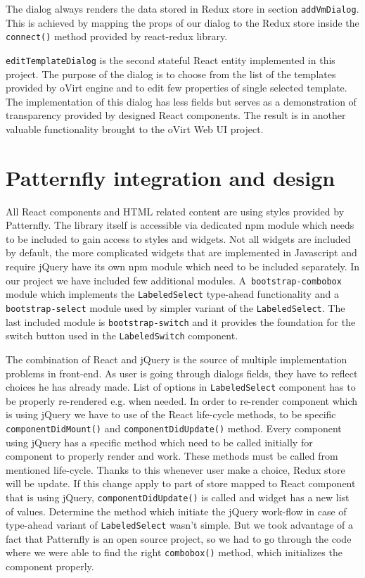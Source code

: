 The dialog always renders the data stored in Redux store in section \texttt{addVmDialog}. This is achieved by mapping the props of our dialog to the Redux store inside the \texttt{connect()} method provided by react-redux library. 

\texttt{editTemplateDialog} is the second stateful React entity implemented in this project. The purpose of the dialog is to choose from the list of the templates provided by oVirt engine and to edit few properties of single selected template. The implementation of this dialog has less fields but serves as a demonstration of transparency provided by designed React components. The result is in another valuable functionality brought to the oVirt Web UI project. 

\section{Patternfly integration and design}
All React components and HTML related content are using styles provided by Patternfly. The library itself is accessible via dedicated npm module which needs to be included to gain access to styles and widgets. Not all widgets are included by default, the more complicated widgets that are implemented in Javascript and require jQuery have its own npm module which need to be included separately. In our project we have included few additional modules. A~\texttt{bootstrap-combobox} module which implements the \texttt{LabeledSelect} type-ahead functionality and a \texttt{bootstrap-select} module used by simpler variant of the \texttt{LabeledSelect}. The last included module is \texttt{bootstrap-switch} and it provides the foundation for the switch button used in the \texttt{LabeledSwitch} component.

The combination of React and jQuery is the source of multiple implementation problems in front-end. As user is going through dialogs fields, they have to reflect choices he has already made. List of options in \texttt{LabeledSelect} component has to be properly re-rendered e.g. when needed. In order to re-render component which is using jQuery we have to use of the React life-cycle methods, to be specific \texttt{componentDidMount()} and \texttt{componentDidUpdate()} method. Every component using jQuery has a specific method which need to be called initially for component to properly render and work. These methods must be called from mentioned life-cycle. Thanks to this whenever user make a choice, Redux store will be update. If this change apply to part of store mapped to React component that is using jQuery, \texttt{componentDidUpdate()} is called and widget has a new list of values. 
Determine the method which initiate the jQuery work-flow in case of type-ahead variant of \texttt{LabeledSelect} wasn't simple. But we took advantage of a fact that Patternfly is an open source project, so we had to go through the code where we were able to find the right \texttt{combobox()} method, which initializes the component properly.

